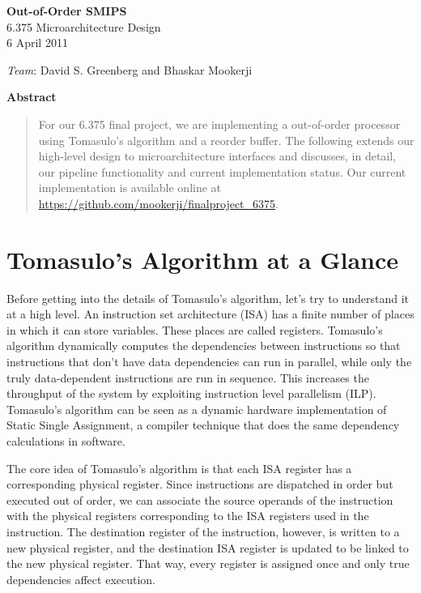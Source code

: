 \documentclass[12pt]{article}
\begin{document}
 \begin{center} \textbf{\large Out-of-Order SMIPS} \\ 6.375
Microarchitecture Design\\ 6 April 2011 \\

 \vspace{\baselineskip}

 \emph{Team}: David S. Greenberg and Bhaskar Mookerji \end{center}

 \begin{center} \textbf{Abstract} \end{center} \begin{quotation} For our 6.375
final project, we are implementing a out-of-order processor using Tomasulo's
algorithm and a reorder buffer. The following extends our high-level design to
microarchitecture interfaces and discusses, in detail, our pipeline
functionality and current implementation status. Our current implementation is
available online at \url{https://github.com/mookerji/finalproject_6375}.
\end{quotation}

\section{Tomasulo's Algorithm at a Glance}

Before getting into the details of Tomasulo's algorithm, let's try to
understand it at a high level. An instruction set architecture (ISA) has a
finite number of places in which it can store variables. These places are
called registers. Tomasulo's algorithm dynamically computes the dependencies
between instructions so that instructions that don't have data dependencies
can run in parallel, while only the truly data-dependent instructions are run
in sequence. This increases the throughput of the system by exploiting
instruction level parallelism (ILP). Tomasulo's algorithm can be seen as a
dynamic hardware implementation of Static Single Assignment, a compiler
technique that does the same dependency calculations in software.

The core idea of Tomasulo's algorithm is that each ISA register has a
corresponding physical register. Since instructions are dispatched in order
but executed out of order, we can associate the source operands of the
instruction with the physical registers corresponding to the ISA registers
used in the instruction. The destination register of the instruction, however,
is written to a new physical register, and the destination ISA register is
updated to be linked to the new physical register. That way, every register is
assigned once and only true dependencies affect execution.
\end{document}
